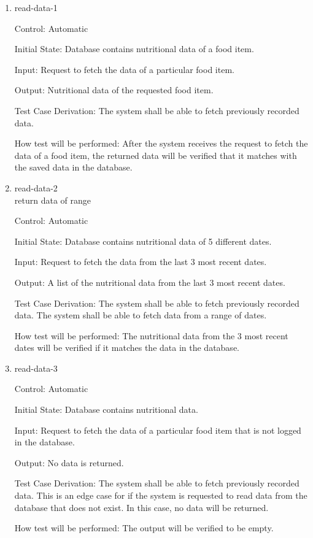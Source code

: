 \documentclass[12pt, titlepage]{article}
\begin{document}
\begin{enumerate}
	
	\item{read-data-1\\}
	
	Control: Automatic
	
	Initial State: Database contains nutritional data of a food item.
	
	Input: Request to fetch the data of a particular food item.
	
	Output: Nutritional data of the requested food item.
	
	Test Case Derivation: The system shall be able to fetch previously recorded data.
	
	How test will be performed: After the system receives the request to fetch the data of a food item, the returned data will be verified that it matches with the saved data in the database.
	
	\item{read-data-2\\} return data of range
	
	Control: Automatic
	
	Initial State: Database contains nutritional data of 5 different dates.
	
	Input: Request to fetch the data from the last 3 most recent dates.
	
	Output: A list of the nutritional data from the last 3 most recent dates.
	
	Test Case Derivation: The system shall be able to fetch previously recorded data. The system shall be able to fetch data from a range of dates.
	
	How test will be performed: The nutritional data from the 3 most recent dates will be verified if it matches the data in the database.
	
	\item{read-data-3\\}
	
	Control: Automatic
	
	Initial State: Database contains nutritional data.
	
	Input: Request to fetch the data of a particular food item that is not logged in the database.
	
	Output: No data is returned.
	
	Test Case Derivation: The system shall be able to fetch previously recorded data. This is an edge case for if the system is requested to read data from the database that does not exist. In this case, no data will be returned.
	
	How test will be performed: The output will be verified to be empty.
	
\end{enumerate}
\end{document}
